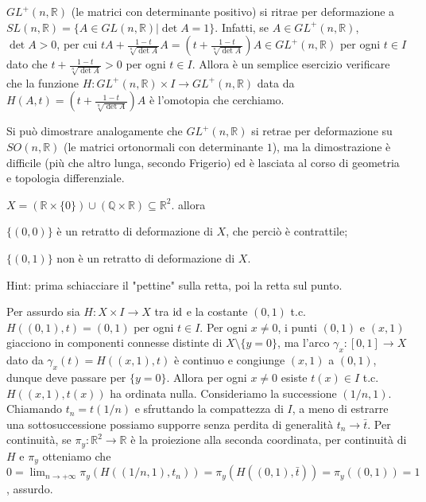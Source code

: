 \begin{ex}
  $GL^+(n, \mathbb{R})$ (le matrici con determinante positivo) si ritrae per deformazione a $SL(n, \mathbb{R})=\{ A \in GL(n, \mathbb{R}) | \det{A}=1\}$. Infatti, se $A \in GL^+(n, \mathbb{R})$, $\det{A}>0$, per cui
  $tA+\frac{1-t}{\sqrt[n]{\det{A}}}A=\left(t+\frac{1-t}{\sqrt[n]{\det{A}}}\right)A \in GL^+(n, \mathbb{R})$ per ogni $t \in I$ dato che $t+\frac{1-t}{\sqrt[n]{\det{A}}}>0$ per ogni $t \in I$.
  Allora è un semplice esercizio verificare che la funzione $H:GL^+(n, \mathbb{R}) \times I \longrightarrow GL^+(n, \mathbb{R})$ data da $H(A, t)=\left(t+\frac{1-t}{\sqrt[n]{\det{A}}}\right)A$ è l'omotopia che cerchiamo.
\end{ex}

Si può dimostrare analogamente che $GL^+(n, \mathbb{R})$ si retrae per deformazione su $SO(n, \mathbb{R})$ (le matrici ortonormali con determinante $1$), ma la dimostrazione è difficile (più che altro lunga, secondo Frigerio) ed è lasciata al corso di geometria e topologia differenziale.

\begin{exc}
  $X=(\mathbb{R} \times \{0\}) \cup (\mathbb{Q} \times \mathbb{R}) \subseteq \mathbb{R}^2$. allora
  \begin{nlist}
    \item $\{(0, 0)\}$ è un retratto di deformazione di $X$, che perciò è contrattile;
    \item $\{(0, 1)\}$ non è un retratto di deformazione di $X$.
  \end{nlist}
\end{exc}

\begin{sol}
  \begin{nlist}
    \item Hint: prima schiacciare il "pettine" sulla retta, poi la retta sul punto.
    \item Per assurdo sia $H:X \times I \longrightarrow X$ tra $\operatorname{id}$ e la costante $(0, 1)$ t.c. $H((0,1), t)=(0, 1)$ per ogni $t \in I$. Per ogni $x \not=0$, i punti $(0, 1)$ e $(x, 1)$ giacciono in componenti connesse distinte di $X \setminus \{y=0\}$, ma l'arco $\gamma_x:[0, 1] \longrightarrow X$ dato da
    $\gamma_x(t)=H((x, 1), t)$ è continuo e congiunge $(x, 1)$ a $(0, 1)$, dunque deve passare per $\{y=0\}$. Allora per ogni $x \not=0$ esiste $t(x) \in I$ t.c. $H((x, 1), t(x))$ ha ordinata nulla. Consideriamo la successione $(1/n, 1)$. Chiamando $t_n=t(1/n)$ e sfruttando la compattezza di $I$, a meno di estrarre una sottosuccessione possiamo supporre senza perdita di generalità $t_n \longrightarrow \bar{t}$.
    Per continuità, se $\pi_y: \mathbb{R}^2 \longrightarrow \mathbb{R}$ è la proiezione alla seconda coordinata, per continuità di $H$ e $\pi_y$ otteniamo che $\displaystyle 0=\lim_{n \longrightarrow +\infty} \pi_y(H((1/n, 1), t_n))=\pi_y(H((0, 1), \bar{t}))=\pi_y((0, 1))=1$, assurdo.
  \end{nlist}
\end{sol}
